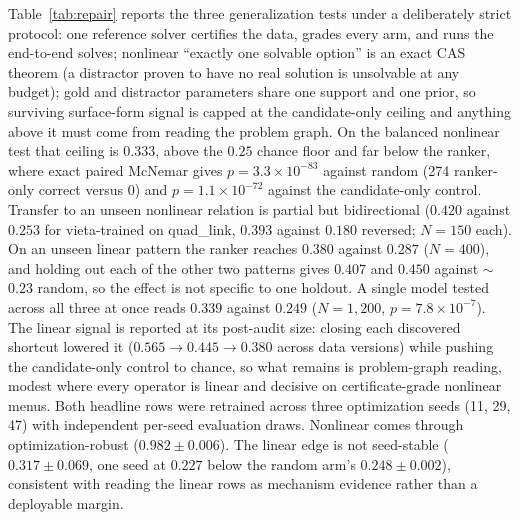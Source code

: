 \documentclass[letterpaper]{article} %
\begin{document}
Table~\ref{tab:repair} reports the three generalization tests under a deliberately strict
protocol: one reference solver certifies the data, grades every arm,
and runs the end-to-end solves; nonlinear ``exactly one solvable option'' is an exact CAS theorem (a distractor proven to
have no real solution is unsolvable at any budget); gold and distractor parameters share one
support and one prior, so surviving surface-form signal is capped at the candidate-only
ceiling and anything above it must come from reading the problem graph. On the balanced nonlinear test that ceiling is $0.333$, above the $0.25$ chance floor and
far below the ranker, where exact paired McNemar gives $p = 3.3\times10^{-83}$ against
random (274 ranker-only correct versus 0) and $p = 1.1\times10^{-72}$ against the
candidate-only control. Transfer to an unseen nonlinear relation is partial but bidirectional ($0.420$ against
$0.253$ for vieta-trained on quad\_link, $0.393$ against $0.180$ reversed; $N{=}150$ each). On an unseen linear pattern the ranker reaches $0.380$ against $0.287$ ($N{=}400$), and
holding out each of the other two patterns gives $0.407$ and $0.450$ against $\sim$$0.23$
random, so the effect is not specific to one holdout. A single model
tested across all three at once reads $0.339$ against $0.249$ ($N{=}1{,}200$, $p =
7.8\times10^{-7}$). The linear signal is reported at its post-audit size: closing each discovered shortcut
lowered it ($0.565 \to 0.445 \to 0.380$ across data versions) while pushing the
candidate-only control to chance, so what remains is problem-graph reading, modest where
every operator is linear and decisive on certificate-grade nonlinear menus. Both
headline rows were retrained across three optimization seeds (11, 29, 47) with independent
per-seed evaluation draws. Nonlinear comes through optimization-robust ($0.982 \pm 0.006$).
The linear edge is not seed-stable ($0.317 \pm 0.069$, one seed at $0.227$ below the random
arm's $0.248 \pm 0.002$), consistent with reading the linear rows as mechanism evidence
rather than a deployable margin.
\end{document}
